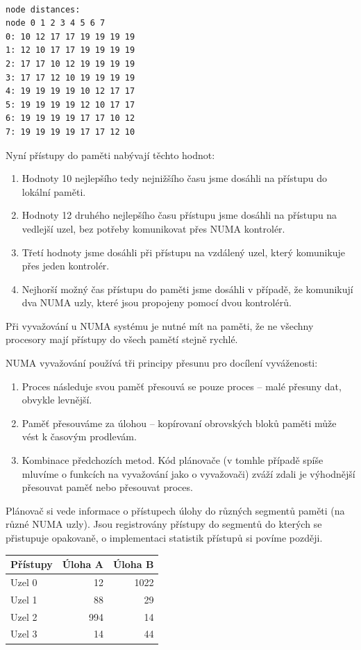 \documentclass[a4paper,12pt]{article}
\begin{document}
\begin{verbatim}

node distances:
node 0 1 2 3 4 5 6 7
0: 10 12 17 17 19 19 19 19
1: 12 10 17 17 19 19 19 19
2: 17 17 10 12 19 19 19 19
3: 17 17 12 10 19 19 19 19
4: 19 19 19 19 10 12 17 17
5: 19 19 19 19 12 10 17 17
6: 19 19 19 19 17 17 10 12
7: 19 19 19 19 17 17 12 10

\end{verbatim}

Nyní přístupy do paměti nabývají těchto hodnot:
\begin{enumerate}
\item Hodnoty 10 nejlepšího tedy nejnižšího času jsme dosáhli na přístupu do lokální paměti.
\item Hodnoty 12 druhého nejlepšího času přístupu jsme dosáhli na přístupu na vedlejší uzel, bez potřeby komunikovat přes NUMA kontrolér. 
\item Třetí hodnoty jsme dosáhli při přístupu na vzdálený uzel, který komunikuje přes jeden kontrolér.
\item Nejhorší možný čas přístupu do paměti jsme dosáhli v případě, že komunikují dva NUMA uzly, které jsou propojeny pomocí dvou kontrolérů.
\end{enumerate}

Při vyvažování u NUMA systému je nutné mít na paměti, že ne všechny procesory mají přístupy do všech pamětí stejně rychlé.

NUMA vyvažování používá tři principy přesunu pro docílení vyváženosti:

\begin{enumerate}
\item Proces následuje svou paměť přesouvá se pouze proces – malé přesuny dat, obvykle levnější.
\item Paměť přesouváme za úlohou – kopírovaní obrovských bloků paměti může vést k časovým prodlevám.
\item Kombinace předchozích metod. Kód plánovače (v tomhle případě spíše mluvíme o funkcích na vyvažování jako o vyvažovači) zváží zdali je výhodnější přesouvat paměť nebo přesouvat proces.
\end{enumerate}

Plánovač si vede informace o přístupech úlohy do různých segmentů paměti (na různé NUMA uzly). Jsou registrovány přístupy do segmentů do kterých se přistupuje opakovaně, o implementaci statistik přístupů si povíme později.

\begin{table}
\centering

\begin{tabular}{|l|r|r|}
\hline
Přístupy & Úloha A & Úloha B \\
\hline
Uzel 0 & 12 & 1022 \\
\hline
Uzel 1 & 88 & 29 \\
\hline
Uzel 2 & 994 & 14 \\
\hline
Uzel 3 & 14 & 44 \\
\hline
\end{tabular}

\end{table}
\end{document}
